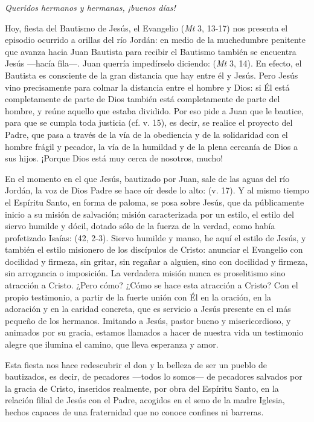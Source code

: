 \begin{body}
\begin{body}
{\emph{Queridos hermanos y hermanas, ¡buenos días!}

Hoy, fiesta del Bautismo de Jesús, el Evangelio (\emph{Mt} 3, 13-17) nos presenta el episodio ocurrido a orillas del río Jordán: en medio de la muchedumbre penitente que avanza hacia Juan Bautista para recibir el Bautismo también se encuentra Jesús ---hacía fila---. Juan querría impedírselo diciendo:  (\emph{Mt} 3, 14). En efecto, el Bautista es consciente de la gran distancia que hay entre él y Jesús. Pero Jesús vino precisamente para colmar la distancia entre el hombre y Dios: si Él está completamente de parte de Dios también está completamente de parte del hombre, y reúne aquello que estaba dividido. Por eso pide a Juan que le bautice, para que se cumpla toda justicia (cf. v. 15), es decir, se realice el proyecto del Padre, que pasa a través de la vía de la obediencia y de la solidaridad con el hombre frágil y pecador, la vía de la humildad y de la plena cercanía de Dios a sus hijos. ¡Porque Dios está muy cerca de nosotros, mucho!

En el momento en el que Jesús, bautizado por Juan, sale de las aguas del río Jordán, la voz de Dios Padre se hace oír desde lo alto:  (v. 17). Y al mismo tiempo el Espíritu Santo, en forma de paloma, se posa sobre Jesús, que da públicamente inicio a su misión de salvación; misión caracterizada por un estilo, el estilo del siervo humilde y dócil, dotado sólo de la fuerza de la verdad, como había profetizado Isaías:  (42, 2-3). Siervo humilde y manso, he aquí el estilo de Jesús, y también el estilo misionero de los discípulos de Cristo: anunciar el Evangelio con docilidad y firmeza, sin gritar, sin regañar a alguien, sino con docilidad y firmeza, sin arrogancia o imposición. La verdadera misión nunca es proselitismo sino atracción a Cristo. ¿Pero cómo? ¿Cómo se hace esta atracción a Cristo? Con el propio testimonio, a partir de la fuerte unión con Él en la oración, en la adoración y en la caridad concreta, que es servicio a Jesús presente en el más pequeño de los hermanos. Imitando a Jesús, pastor bueno y misericordioso, y animados por su gracia, estamos llamados a hacer de nuestra vida un testimonio alegre que ilumina el camino, que lleva esperanza y amor.

Esta fiesta nos hace redescubrir el don y la belleza de ser un pueblo de bautizados, es decir, de pecadores ---todos lo somos--- de pecadores salvados por la gracia de Cristo, inseridos realmente, por obra del Espíritu Santo, en la relación filial de Jesús con el Padre, acogidos en el seno de la madre Iglesia, hechos capaces de una fraternidad que no conoce confines ni barreras.

}
\end{body}
\end{body}
